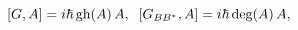\begin{equation}
\lbrack
G,A]=i\hbar\,\hbox{gh}(A)\,A,\;\;[G_{BB^{\ast}},A]=i\hbar\,
\hbox{deg}(A)\,A,\label{3.18}%
\end{equation}

